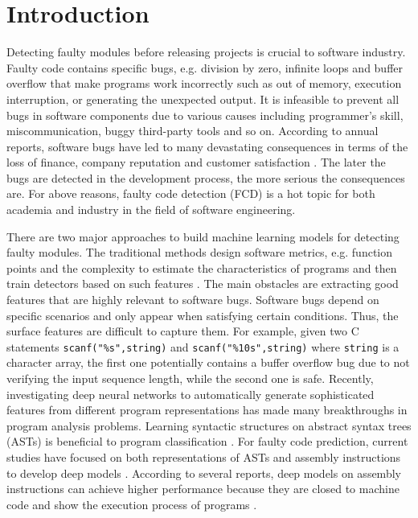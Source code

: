 \section{Introduction}
\label{sec:introduction}
Detecting faulty modules before releasing projects is crucial to software industry. Faulty code contains specific bugs, e.g. division by zero, infinite loops and buffer overflow that make programs work incorrectly such as out of memory, execution interruption, or generating the unexpected output. It is infeasible to prevent all bugs in software components due to various causes including programmer's skill, miscommunication, buggy third-party tools and so on. According to annual reports, software bugs have led to many devastating consequences in terms of the loss of finance, company reputation and customer satisfaction \cite{laradji2015software}. The later the bugs are detected in the development process, the more serious the consequences are. For above reasons, faulty code detection (FCD) is a hot topic for both academia and industry in the field of software engineering.

There are two major approaches to build machine learning models for detecting faulty modules. The traditional methods design software metrics, e.g. function points and the complexity to estimate the characteristics of programs and then train detectors based on such features \cite{chidamber1994metrics, lorenz1994object, curtis1979measuring}. The main obstacles are extracting good features that are highly relevant to software bugs. Software bugs depend on specific scenarios and only appear when satisfying certain conditions. Thus, the surface features are difficult to capture them. For example, given two C statements \texttt{scanf("\%s",string)} and  \texttt{scanf("\%10s",string)} where \texttt{string} is a character array, the first one potentially contains a buffer overflow bug due to not verifying the input sequence length, while the second one is safe. Recently, investigating deep neural networks to automatically generate sophisticated features from different program representations has made many breakthroughs in program analysis problems. Learning syntactic structures on abstract syntax trees (ASTs) is beneficial to program classification \cite{phan2017sibstcnn, mou2016convolutional}. For faulty code prediction, current studies have focused on both representations of ASTs and assembly instructions to develop deep models \cite{phan2017convolutional, li2017software}. According to several reports, deep models on assembly instructions can achieve higher performance because they are closed to machine code and show the execution process of programs \cite{phan2017convolutional, phan2017conv_asm}.    

